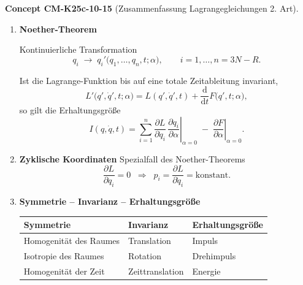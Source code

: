 \documentclass[10pt, letterpaper]{article}
\newcommand{\CustomHeading}[3]{%
  \par\medskip\noindent%
  \textbf{#1 #2} \textnormal{(#3)}.\enskip%
}
\newenvironment{CONC}[2]{\begin{unitbox}\CustomHeading{Concept}{#1}{#2}}{\end{unitbox}}
\begin{document}
\begin{CONC}{CM-K25c-10-15}{Zusammenfassung Lagrangegleichungen 2. Art}
\begin{enumerate}
  \item \textbf{Noether-Theorem}

        Kontinuierliche Transformation
        \[
          q_i \;\longrightarrow\;
          q_i'\bigl(q_1,\dots,q_n,t;\alpha\bigr),
          \qquad i=1,\dots,n=3N-R.
        \]

        Ist die Lagrange-Funktion bis auf eine totale Zeitableitung invariant,
        \[
          L'\bigl(q',\dot q',t;\alpha\bigr)
          = L(q',\dot q',t)
            +\frac{\mathrm d}{\mathrm dt}F\bigl(q',t;\alpha\bigr),
        \]
        so gilt die Erhaltungsgröße
        \[
          I(q,\dot q,t)
          = \sum_{i=1}^{n}
              \frac{\partial L}{\partial\dot q_i}\,
              \left.
                \frac{\partial q_i}{\partial\alpha}
              \right|_{\alpha=0}
            \;-\;
            \left.
              \frac{\partial F}{\partial\alpha}
            \right|_{\alpha=0}.
        \]

  \item \textbf{Zyklische Koordinaten}  
        Spezialfall des Noether-Theorems  
        \[
          \frac{\partial L}{\partial q_i}=0
          \;\;\Longrightarrow\;\;
          p_i=\frac{\partial L}{\partial\dot q_i}
          =\text{konstant}.
        \]

  \item \textbf{Symmetrie – Invarianz – Erhaltungsgröße}

        \begin{center}
        \begin{tabular}{|l|l|l|}
          \hline
          \textbf{Symmetrie} & \textbf{Invarianz} & \textbf{Erhaltungsgröße} \\ \hline
          Homogenität des Raumes        & Translation & Impuls \\ \hline
          Isotropie des Raumes          & Rotation    & Drehimpuls \\ \hline
          Homogenität der Zeit          & Zeittranslation & Energie \\ \hline
        \end{tabular}
        \end{center}
\end{enumerate}
\end{CONC}
\end{document}
